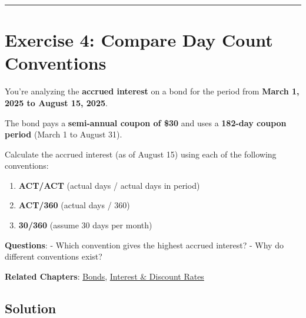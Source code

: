 \documentclass[
  letterpaper,
]{scrbook}
\providecommand{\tightlist}{%
  \setlength{\itemsep}{0pt}\setlength{\parskip}{0pt}}
\begin{document}
\begin{center}\rule{0.5\linewidth}{0.5pt}\end{center}

\section{Exercise 4: Compare Day Count
Conventions}\label{exercise-4-compare-day-count-conventions}

\begin{tcolorbox}[enhanced jigsaw, toptitle=1mm, colbacktitle=quarto-callout-note-color!10!white, opacityback=0, leftrule=.75mm, breakable, colframe=quarto-callout-note-color-frame, toprule=.15mm, opacitybacktitle=0.6, coltitle=black, bottomrule=.15mm, colback=white, arc=.35mm, titlerule=0mm, rightrule=.15mm, left=2mm, title=\textcolor{quarto-callout-note-color}{\faInfo}\hspace{0.5em}{Problem}, bottomtitle=1mm]

You're analyzing the \textbf{accrued interest} on a bond for the period
from \textbf{March 1, 2025 to August 15, 2025}.

The bond pays a \textbf{semi-annual coupon of \$30} and uses a
\textbf{182-day coupon period} (March 1 to August 31).

Calculate the accrued interest (as of August 15) using each of the
following conventions:

\begin{enumerate}
\def\labelenumi{\arabic{enumi}.}
\tightlist
\item
  \textbf{ACT/ACT} (actual days / actual days in period)
\item
  \textbf{ACT/360} (actual days / 360)
\item
  \textbf{30/360} (assume 30 days per month)
\end{enumerate}

\textbf{Questions}: - Which convention gives the highest accrued
interest? - Why do different conventions exist?

\textbf{Related Chapters}: \hyperref[bonds]{Bonds},
\hyperref[interest-discount-rates]{Interest \& Discount Rates}

\end{tcolorbox}

\subsection*{Solution}\label{solution-3}
\end{document}

